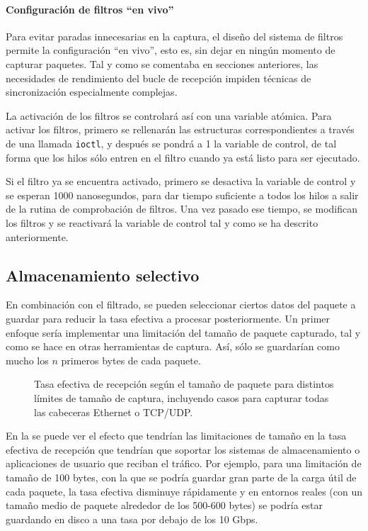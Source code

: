 \documentclass[twoside, 12pt]{epstfg}
\begin{document}
\paragraph{Configuración de filtros ``en vivo''}

Para evitar paradas innecesarias en la captura, el diseño del sistema de filtros permite la configuración ``en vivo'', esto es, sin dejar en ningún momento de capturar paquetes. Tal y como se comentaba en secciones anteriores, las necesidades de rendimiento del bucle de recepción impiden técnicas de sincronización especialmente complejas.

La activación de los filtros se controlará así con una variable atómica. Para activar los filtros, primero se rellenarán las estructuras correspondientes a través de una llamada \texttt{ioctl}, y después se pondrá a 1 la variable de control, de tal forma que los hilos sólo entren en el filtro cuando ya está listo para ser ejecutado.

Si el filtro ya se encuentra activado, primero se desactiva la variable de control y se esperan 1000 nanosegundos, para dar tiempo suficiente a todos los hilos a salir de la rutina de comprobación de filtros. Una vez pasado ese tiempo, se modifican los filtros y se reactivará la variable de control tal y como se ha descrito anteriormente.

\subsection{Almacenamiento selectivo}

En combinación con el filtrado, se pueden seleccionar ciertos datos del paquete a guardar para reducir la tasa efectiva a procesar posteriormente. Un primer enfoque sería implementar una limitación del tamaño de paquete capturado, tal y como se hace en otras herramientas de captura. Así, sólo se guardarían como mucho los $n$ primeros bytes de cada paquete.

\begin{figure}[btp]
\caption[Tasa efectiva limitando el tamaño de paquete]{Tasa efectiva de recepción según el tamaño de paquete para distintos límites de tamaño de captura, incluyendo casos para capturar todas las cabeceras Ethernet o TCP/UDP.}
\label{fig:Desarrollo:CaplenEffects}
\end{figure}

En la  se puede ver el efecto que tendrían las limitaciones de tamaño en la tasa efectiva de recepción que tendrían que soportar los sistemas de almacenamiento o aplicaciones de usuario que reciban el tráfico. Por ejemplo, para una limitación de tamaño de 100 bytes, con la que se podría guardar gran parte de la carga útil de cada paquete, la tasa efectiva disminuye rápidamente y en entornos reales (con un tamaño medio de paquete alrededor de los 500-600 bytes) se podría estar guardando en disco a una tasa por debajo de los 10 Gbps.
\end{document}
